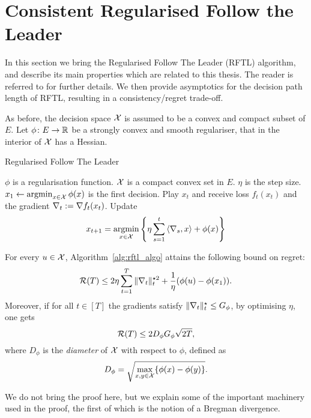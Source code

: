 \section{Consistent Regularised Follow the Leader}
In this section we bring the Regularised Follow The Leader (RFTL) algorithm, and describe its main properties which are related to this thesis. The reader is referred to \citet{hazan2016introduction} for further details. We then provide asymptotics for the decision path length of RFTL, resulting in a consistency/regret trade-off.

As before, the decision space $\mathcal{X}$ is assumed to be a convex and compact subset of $E$. Let $\phi\colon E \to \mathbb{R}$ be a strongly convex and smooth regulariser, that in the interior of $\mathcal{X}$ has a Hessian.

\begin{algorithm}[h!] 
    \caption{Regularised Follow The Leader}
\label{alg:rftl_algo}
\begin{algorithmic}
    \STATE $\phi$ is a regularisation function.
    \STATE $\mathcal{X}$ is a compact convex set in $E$.
    \STATE $\eta$ is the step size.
    \STATE $x_1 \leftarrow \mathop{\mathrm{argmin}}_{x \in \mathcal{X}} \phi(x)$ is the first decision.
    \STATE Play $x_t$ and receive loss $f_t(x_t)$ and the gradient $\nabla_t := \nabla f_t(x_t)$.
    \STATE Update
    \[
        x_{t+1} = \mathop{\mathrm{argmin}}_{x\in \mathcal{X}} \left\{ \eta \sum_{s=1}^{t} \left\langle \nabla_s,x \right\rangle + \phi(x) \right\}
    \]
    \ENDFOR
\end{algorithmic}
\end{algorithm}

\begin{theorem}\label{thm:rftl}
    For every $u \in \mathcal{X}$, Algorithm~\ref{alg:rftl_algo} attains the following bound on regret:
    \[
        \mathcal{R}(T) \leq 2\eta \sum_{t=1}^T\|\nabla_t\|_t^{\star 2} + \frac{1}{\eta}(\phi(u) - \phi(x_1)).
    \]
    Moreover, if for all $t\in[T]$ the gradients satisfy $\|\nabla_t\|_t^{\star} \leq G_\phi$, by optimising $\eta$, one gets
    \[
        \mathcal{R}(T) \leq 2D_\phi G_\phi \sqrt{2T},
    \]
    where $D_\phi$ is the \emph{diameter} of $\mathcal{X}$ with respect to $\phi$, defined as
    \[
    D_\phi = \sqrt{\max_{x,y\in\mathcal{X}} \{\phi(x) - \phi(y)\} }.
    \]

\end{theorem}

We do not bring the proof here, but we explain some of the important machinery used in the proof, the first of which is the notion of a Bregman divergence.

